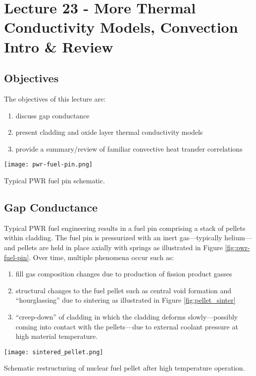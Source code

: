 \chapter{Lecture 23 - More Thermal Conductivity Models, Convection Intro \& Review}
\label{ch:ch23}
\section{Objectives}
The objectives of this lecture are:
\begin{enumerate}
\item discuss gap conductance
\item present cladding and oxide layer thermal conductivity models
\item provide a summary/review of familiar convective heat transfer correlations
\end{enumerate}
\begin{marginfigure}
\texttt{[image: pwr-fuel-pin.png]}
\caption{Typical PWR fuel pin schematic.}
\label{fig:pwr-fuel-pin}
\end{marginfigure}
\section{Gap Conductance} 
Typical PWR fuel engineering results in a fuel pin comprising a stack of pellets within cladding.  The fuel pin is pressurized with an inert gas---typically helium--- and pellets are held in place axially with springs as illustrated in Figure \ref{fig:pwr-fuel-pin}.  Over time, multiple phenomena occur such as:\cite{bartel2015state}
\begin{enumerate}
\item fill gas composition changes due to production of fission product gasses
\item structural changes to the fuel pellet such as central void formation and  ``hourglassing'' due to sintering as illustrated in Figure \ref{fig:pellet_sinter}
\item ``creep-down'' of cladding in which the cladding deforms slowly---possibly coming into contact with the pellets---due to external coolant pressure at high material temperature.
\end{enumerate}

\begin{marginfigure}
\texttt{[image: sintered\_pellet.png]}
\caption{Schematic restructuring of nuclear fuel pellet after high temperature operation.}
\label{fig:pellet_sinter}
\end{marginfigure}

